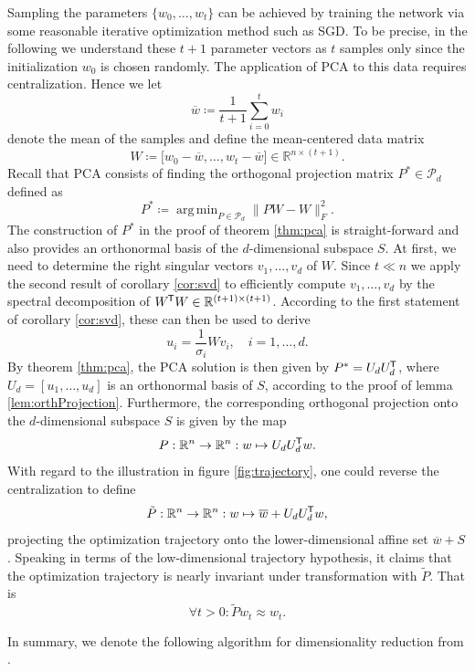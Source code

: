 \documentclass[11pt, a4paper]{article}
\newcommand{\R}{\mathbb{R}}
\renewcommand{\P}{\mathcal{P}}
\newcommand*{\tr}{^{\mkern-1.5mu\mathsf{T}}}
\DeclareMathOperator*{\argmin}{arg\,min}
\begin{document}
Sampling the parameters $\{ w_0, \dots, w_t \}$ can be achieved by training the network via some reasonable iterative optimization method such as SGD. To be precise, in the following we understand these $t+1$ parameter vectors as $t$ samples only since the initialization $w_0$ is chosen randomly. The application of PCA to this data requires centralization. Hence we let
\[ \overline{w} \coloneq \frac{1}{t+1} \sum_{i=0}^{t} w_i \]
denote the mean of the samples and define the mean-centered data matrix
\[ W \coloneq \big [ w_0 - \overline{w}, \dots, w_t - \overline{w} \big ] \in \R^{n \times (t+1)}. \]
Recall that PCA consists of finding the orthogonal projection matrix $P^* \in \P_d$ defined as
\[ P^* \coloneq \argmin_{P \in \P_d} \big \| PW - W \big \|_F^2. \]
The construction of $P^*$ in the proof of theorem \ref{thm:pca} is straight-forward and also provides an orthonormal basis of the $d$-dimensional subspace $S$. At first, we need to determine the right singular vectors $v_1, \dots, v_d$ of $W$. Since $t \ll n$ we apply the second result of corollary \ref{cor:svd} to efficiently compute $v_1, \dots, v_d$ by the spectral decomposition of $W\tr W \in \R^{(t+1) \times (t+1)}$. According to the first statement of corollary \ref{cor:svd}, these can then be used to derive
\[ u_i = \frac{1}{\sigma_i} Wv_i, \quad i=1, \dots, d. \]
By theorem \ref{thm:pca}, the PCA solution is then given by $P^* = U_dU_d \tr$, where $U_d = [u_1, \dots, u_d]$ is an orthonormal basis of $S$, according to the proof of lemma \ref{lem:orthProjection}. Furthermore, the corresponding orthogonal projection onto the $d$-dimensional subspace $S$ is given by the map
\[ P : \R^n \to \R^n : w \mapsto U_dU_d\tr w. \]
With regard to the illustration in figure \ref{fig:trajectory}, one could reverse the centralization to define
\[ \tilde{P} : \R^n \to \R^n : w \mapsto \overline{w} + U_dU_d\tr w, \]
projecting the optimization trajectory onto the lower-dimensional affine set $\overline{w} + S$. Speaking in terms of the low-dimensional trajectory hypothesis, it claims that the optimization trajectory is nearly invariant under transformation with $\tilde{P}$. That is 
\[ \forall t>0: \tilde{P}w_t \approx w_t. \]

In summary, we denote the following algorithm for dimensionality reduction from \cite{Paper}.
\end{document}
